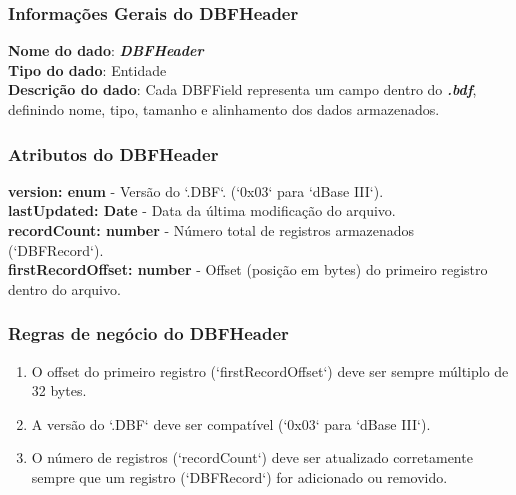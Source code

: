 \subsubsection{Informações Gerais do DBFHeader}
\textbf{Nome do dado}: \textit{\textbf{DBFHeader}} \\  
\textbf{Tipo do dado}: Entidade \\  
\textbf{Descrição do dado}: Cada DBFField representa um campo dentro do \textit{\textbf{.bdf}}, definindo nome, tipo, tamanho e alinhamento dos dados armazenados. \\  

\subsubsection{Atributos do DBFHeader}  
\textbf{version: enum} - Versão do `.DBF`. (`0x03` para `dBase III`). \\  
\textbf{lastUpdated: Date} - Data da última modificação do arquivo. \\  
\textbf{recordCount: number} - Número total de registros armazenados (`DBFRecord`). \\  
\textbf{firstRecordOffset: number} - Offset (posição em bytes) do primeiro registro dentro do arquivo. \\  

\subsubsection{Regras de negócio do DBFHeader}
\begin{enumerate}
    \item O offset do primeiro registro (`firstRecordOffset`) deve ser sempre múltiplo de 32 bytes.
    \item A versão do `.DBF` deve ser compatível (`0x03` para `dBase III`).
    \item O número de registros (`recordCount`) deve ser atualizado corretamente sempre que um registro (`DBFRecord`) for adicionado ou removido.
\end{enumerate}


